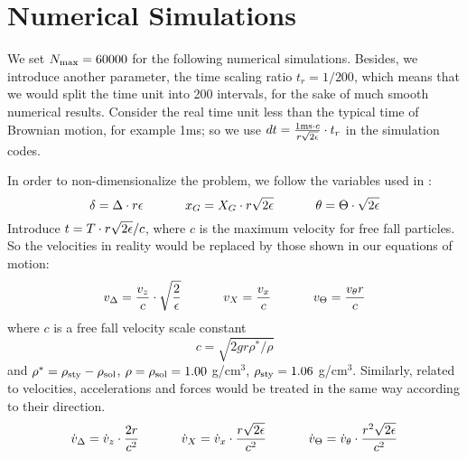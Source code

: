 \documentclass[fleqn,10pt]{InternshipReport_SI-ENS-PSL}
\begin{document}



\section*{Numerical Simulations} %



\label{Discretisation algorithm}

We set $N_{\mathrm{max}} = 60000$ for the following numerical simulations. Besides, we introduce another parameter, the time scaling ratio $t_r = 1/200$, which means that we would split the time unit into 200 intervals, for the sake of much smooth numerical results. Consider the real time unit less than the typical time of Brownian motion, for example 1ms; so we use $dt = \frac{1\mathrm{ms} \cdot c}{r \sqrt{2\epsilon}} \cdot t_r$ in the simulation codes.



In order to non-dimensionalize the problem, we follow the variables used in \cite{JFM2015}:
$$ \delta = \Delta \cdot r \epsilon \ \ \ \ \ \ \ \ \ \  
x_G = X_G \cdot r \sqrt{2\epsilon} \ \ \ \ \ \ \ \ \ \  
\theta = \Theta \cdot \sqrt{2\epsilon} $$
Introduce $t = T \cdot r \sqrt{2\epsilon} / c$, where $c$ is the maximum velocity for free fall particles. So the velocities in reality would be replaced by those shown in our equations of motion:
$$ v_\Delta = \frac{v_z}{c} \cdot \sqrt{\frac{2}{\epsilon}} \ \ \ \ \ \ \ \ \ \  
v_X = \frac{v_x}{c} \ \ \ \ \ \ \ \ \ \  
v_\Theta = \frac{v_\theta r}{c} $$
where $c$ is a free fall velocity scale constant
$$ c = \sqrt{2 g r \rho^\ast / \rho} $$
and $\rho^\ast = \rho_{\mathrm{sty}} - \rho_{\mathrm{sol}}$, $\rho = \rho_{\mathrm{sol}} = 1.00$ g/cm$^3$, $\rho_{\mathrm{sty}} = 1.06$ g/cm$^3$.
Similarly, related to velocities, accelerations and forces would be treated in the same way according to their direction.
$$ \dot{v}_\Delta = \dot{v}_z \cdot \frac{2r}{c^2} \ \ \ \ \ \ \ \ \ \  \dot{v}_X = \dot{v}_x \cdot \frac{r \sqrt{2\epsilon}}{c^2} \ \ \ \ \ \ \ \ \ \  \dot{v}_\Theta = \dot{v}_\theta \cdot \frac{r^2 \sqrt{2\epsilon}}{c^2} $$
\end{document}
